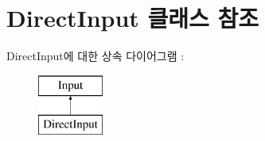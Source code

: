\hypertarget{class_direct_input}{}\section{Direct\+Input 클래스 참조}
\label{class_direct_input}
Direct\+Input에 대한 상속 다이어그램 \+: \begin{figure}[H]
\begin{center}
\leavevmode
\includegraphics[height=2.000000cm]{class_direct_input}
\end{center}
\end{figure}
